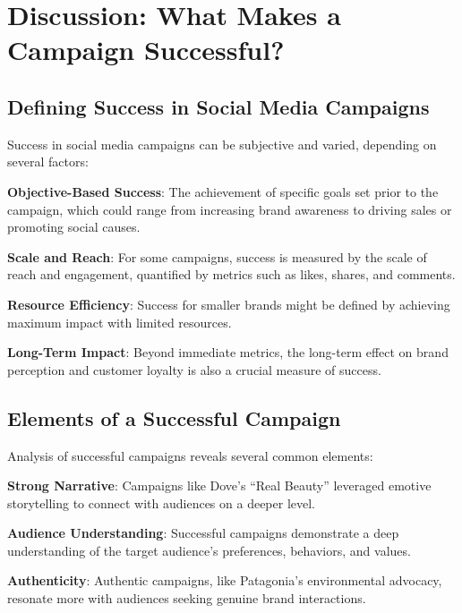 \documentclass[
]{book}
\begin{document}
\hypertarget{discussion-what-makes-a-campaign-successful}{%
\section*{Discussion: What Makes a Campaign Successful?}\label{discussion-what-makes-a-campaign-successful}}

\hypertarget{defining-success-in-social-media-campaigns}{%
\subsection{Defining Success in Social Media Campaigns}\label{defining-success-in-social-media-campaigns}}

Success in social media campaigns can be subjective and varied, depending on several factors:

\textbf{Objective-Based Success}: The achievement of specific goals set prior to the campaign, which could range from increasing brand awareness to driving sales or promoting social causes.

\textbf{Scale and Reach}: For some campaigns, success is measured by the scale of reach and engagement, quantified by metrics such as likes, shares, and comments.

\textbf{Resource Efficiency}: Success for smaller brands might be defined by achieving maximum impact with limited resources.

\textbf{Long-Term Impact}: Beyond immediate metrics, the long-term effect on brand perception and customer loyalty is also a crucial measure of success.

\hypertarget{elements-of-a-successful-campaign}{%
\subsection{Elements of a Successful Campaign}\label{elements-of-a-successful-campaign}}

Analysis of successful campaigns reveals several common elements:

\textbf{Strong Narrative}: Campaigns like Dove's ``Real Beauty'' leveraged emotive storytelling to connect with audiences on a deeper level.

\textbf{Audience Understanding}: Successful campaigns demonstrate a deep understanding of the target audience's preferences, behaviors, and values.

\textbf{Authenticity}: Authentic campaigns, like Patagonia's environmental advocacy, resonate more with audiences seeking genuine brand interactions.
\end{document}
